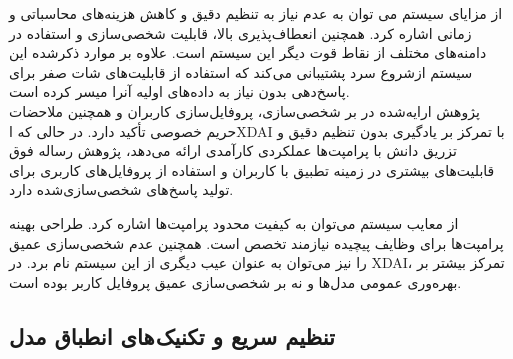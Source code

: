 از مزایای سیستم %
\cite{yu2022xdai}
 می توان به عدم نیاز به تنظیم دقیق و کاهش هزینه‌های محاسباتی و زمانی اشاره کرد. همچنین انعطاف‌پذیری بالا، قابلیت شخصی‌سازی و استفاده در دامنه‌های مختلف از نقاط قوت دیگر این سیستم است. علاوه بر موارد ذکرشده این سیستم ازشروع سرد پشتیبانی می کند که استفاده از قابلیت‌های شات صفر برای پاسخ‌دهی بدون نیاز به داده‌های اولیه آنرا میسر کرده است.\\

پژوهش ارایه‌شده در%
\cite{yu2022xdai}
 بر شخصی‌سازی، پروفایل‌سازی کاربران و همچنین ملاحضات حریم خصوصی تأکید دارد. در حالی که اXDAI با تمرکز بر یادگیری بدون تنظیم دقیق و تزریق دانش با پرامپت‌ها عملکردی کارآمدی ارائه می‌دهد، پژوهش رساله فوق قابلیت‌های بیشتری در زمینه تطبیق با کاربران و استفاده از پروفایل‌های کاربری برای تولید پاسخ‌های شخصی‌سازی‌شده دارد.

از معایب سیستم%
\cite{yu2022xdai}
می‌توان به کیفیت محدود پرامپت‌ها اشاره کرد. طراحی بهینه پرامپت‌ها برای وظایف پیچیده نیازمند تخصص است. همچنین عدم شخصی‌سازی عمیق را نیز می‌توان به عنوان عیب دیگری از این سیستم نام برد. در XDAI، تمرکز بیشتر بر بهره‌وری عمومی مدل‌ها و نه بر شخصی‌سازی عمیق پروفایل کاربر بوده است.


\subsection{تنظیم سریع و تکنیک های انطباق مدل}


